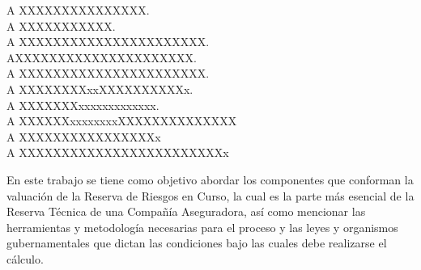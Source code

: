 \documentclass[11pt,twoside,openright,spanish]{report}
\numberwithin{equation}{chapter}
\numberwithin{figure}{chapter}
\numberwithin{table}{chapter}
\begin{document}
	\newpage
	$\ $
	\thispagestyle{empty} %
	
	\begin{acknowledgements}
		\doublespacing
		A XXXXXXXXXXXXXXX.
		\\
		
		\doublespacing
		A XXXXXXXXXXX.
		\\
		
		\doublespacing
		A XXXXXXXXXXXXXXXXXXXXXX.
		\\
		
		\doublespacing
		AXXXXXXXXXXXXXXXXXXXXX.
		\\
		
		\doublespacing
		A XXXXXXXXXXXXXXXXXXXXXX.
		\\
		
		\doublespacing
		A XXXXXXXXxxXXXXXXXXXXx.
		\\
		
		\doublespacing
		A XXXXXXXxxxxxxxxxxxxx.   
		\\
		
		\doublespacing
		A XXXXXXxxxxxxxxXXXXXXXXXXXXXX
		\\
		
		\doublespacing
		A XXXXXXXXXXXXXXXXx
		\\
		
		\doublespacing
		A XXXXXXXXXXXXXXXXXXXXXXXXx
		\\
		
		
	\end{acknowledgements}
	
	
	\tableofcontents
	
	
	\addtolength{\headheight}{\baselineskip}
	\pagestyle{fancy}
	\cleardoublepage
	
		\begin{comment}
	\begin{notation}
		\addcontentsline{toc}{chapter}{\numberline{}Notación}
		\pagenumbering{arabic}
		\doublespacing
		Que deberia incluir aqui?.
	\end{notation}
		\end{comment}
		
	\begin{preface}
		
		En este trabajo se tiene como objetivo abordar los componentes que conforman la valuación de la Reserva de Riesgos en Curso, la cual es la parte más esencial de la Reserva Técnica de una Compañía Aseguradora, así como mencionar las herramientas y metodología necesarias para el proceso y las leyes y organismos gubernamentales que dictan las condiciones bajo las cuales debe realizarse el cálculo.
		
	\end{preface}
	
\end{document}
